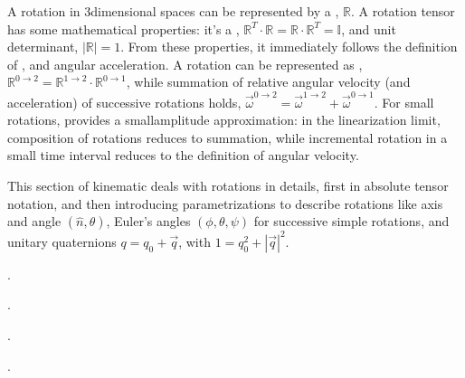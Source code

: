 \documentclass[letterpaper,10pt,english]{jupyterBook}
\begin{document}
\sphinxAtStartPar
A rotation in 3\sphinxhyphen{}dimensional spaces can be represented by a , \(\mathbb{R}\). A rotation tensor has some mathematical properties: it’s a , \(\mathbb{R}^T \cdot \mathbb{R} = \mathbb{R} \cdot \mathbb{R}^T = \mathbb{I}\), and unit determinant, \(|\mathbb{R}| = 1\).
From these properties, it immediately follows the definition of , and angular acceleration. A rotation can be represented as , \(\mathbb{R}^{0\rightarrow 2} = \mathbb{R}^{1\rightarrow 2} \cdot \mathbb{R}^{0\rightarrow 1}\), while summation of relative angular velocity (and acceleration) of successive rotations holds, \(\vec{\omega}^{0 \rightarrow 2} = \vec{\omega}^{1 \rightarrow 2} + \vec{\omega}^{0 \rightarrow 1}\). For small rotations,  provides a small\sphinxhyphen{}amplitude approximation: in the linearization limit, composition of rotations reduces to summation, while incremental rotation in a small time interval reduces to the definition of angular velocity.

\sphinxAtStartPar
This section of kinematic deals with rotations in details, first in absolute tensor notation, and then introducing parametrizations to describe rotations like axis and angle \((\hat{n}, \theta)\), Euler’s angles \((\phi, \theta, \psi)\) for successive simple rotations, and unitary quaternions \(q = q_0 + \vec{q}\), with \(1 = q_0^2 + |\vec{q}|^2\).

\sphinxAtStartPar
{\hyperref[\detokenize{ch/kinematics-rotations-tensors:classical-mechanics-kinematics-rotations-tensor}]{}}.

\sphinxAtStartPar
{\hyperref[\detokenize{ch/kinematics-rotations-param-axis-angle:classical-mechanics-kinematics-rotations-axis-angle}]{}}.

\sphinxAtStartPar
{\hyperref[\detokenize{ch/kinematics-rotations-param-euler:classical-mechanics-kinematics-rotations-euler}]{}}.

\sphinxAtStartPar
{\hyperref[\detokenize{ch/kinematics-rotations-param-quaternions:classical-mechanics-kinematics-rotations-quaternions}]{}}.
\end{document}
